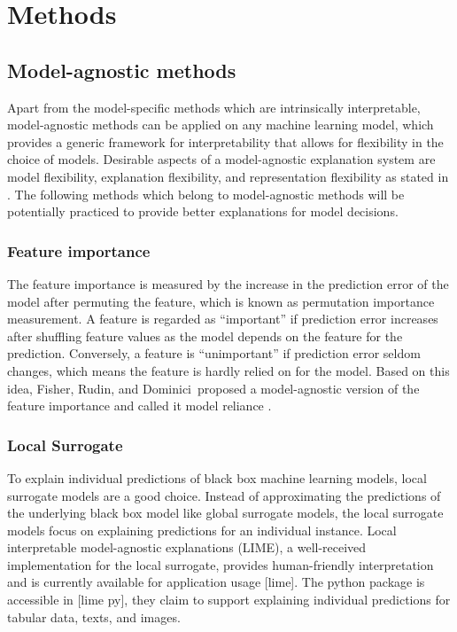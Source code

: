 \documentclass[runningheads]{llncs}
\begin{document}
	\section{Methods}
	
	\subsection{Model-agnostic methods}
	
	Apart from the model-specific methods which are intrinsically interpretable, model-agnostic methods can be applied on any machine learning model, which provides a generic framework for interpretability that allows for flexibility in the choice of models. Desirable aspects of a model-agnostic explanation system are model flexibility, explanation flexibility, and representation flexibility as stated in \cite{ribeiro2016model}. The following methods which belong to model-agnostic methods will be potentially practiced to provide better explanations for model decisions. 
	
	\subsubsection{Feature importance}
	The feature importance is measured by the increase in the prediction error of the model after permuting the feature, which is known as permutation importance measurement. A feature is regarded as “important” if prediction error increases after shuffling feature values as the model depends on the feature for the prediction. Conversely, a feature is “unimportant” if prediction error seldom changes, which means the feature is hardly relied on for the model. Based on this idea, Fisher, Rudin, and Dominici proposed a model-agnostic version of the feature importance and called it model reliance \cite{fisher2018model}.
	
	\subsubsection{Local Surrogate}
	To explain individual predictions of black box machine learning models, local surrogate models are a good choice. Instead of approximating the predictions of the underlying black box model like global surrogate models, the local surrogate models focus on explaining predictions for an individual instance. Local interpretable model-agnostic explanations (LIME), a well-received implementation for the local surrogate, provides human-friendly interpretation and is currently available for application usage [lime]. The python package is accessible in [lime py], they claim to support explaining individual predictions for tabular data, texts, and images.
	
\end{document}
